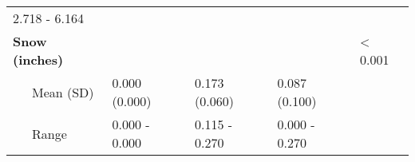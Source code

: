 \begin{longtable}[c]{@{}lllll@{}}
\begin{minipage}[t]{0.15\columnwidth}
2.718 - 6.164
\end{minipage} & \begin{minipage}[t]{0.52\columnwidth}\raggedright
\end{minipage}
\\\addlinespace
\begin{minipage}[t]{0.33\columnwidth}\raggedright
\textbf{Snow (inches)}
\end{minipage} & \begin{minipage}[t]{0.15\columnwidth}\raggedright
\end{minipage} & \begin{minipage}[t]{0.15\columnwidth}\raggedright
\end{minipage} & \begin{minipage}[t]{0.15\columnwidth}\raggedright
\end{minipage} & \begin{minipage}[t]{0.52\columnwidth}\raggedright
\textless{} 0.001
\end{minipage}
\\\addlinespace
\begin{minipage}[t]{0.33\columnwidth}\raggedright
~~~Mean (SD)
\end{minipage} & \begin{minipage}[t]{0.15\columnwidth}\raggedright
0.000 (0.000)
\end{minipage} & \begin{minipage}[t]{0.15\columnwidth}\raggedright
0.173 (0.060)
\end{minipage} & \begin{minipage}[t]{0.15\columnwidth}\raggedright
0.087 (0.100)
\end{minipage} & \begin{minipage}[t]{0.52\columnwidth}\raggedright
\end{minipage}
\\\addlinespace
\begin{minipage}[t]{0.33\columnwidth}\raggedright
~~~Range
\end{minipage} & \begin{minipage}[t]{0.15\columnwidth}\raggedright
0.000 - 0.000
\end{minipage} & \begin{minipage}[t]{0.15\columnwidth}\raggedright
0.115 - 0.270
\end{minipage} & \begin{minipage}[t]{0.15\columnwidth}\raggedright
0.000 - 0.270
\end{minipage} & \begin{minipage}[t]{0.52\columnwidth}\raggedright

\end{minipage}
\end{longtable}
